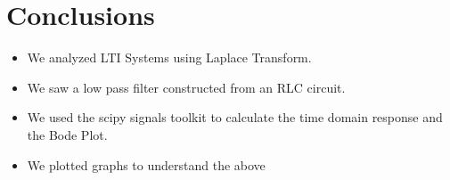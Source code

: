 \documentclass[11pt, a4paper]{article}
\begin{document}
\section{Conclusions}
\begin{itemize}
\item We  analyzed LTI Systems using Laplace Transform.
\item We saw a low pass filter constructed from an RLC circuit.
\item We used the scipy signals toolkit to calculate the time domain response and the Bode Plot.
\item We plotted graphs to understand the above
\end{itemize}
\end{document}
